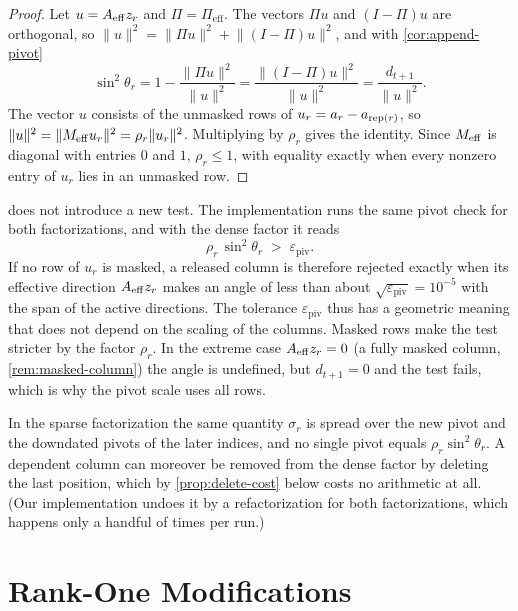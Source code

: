 \begin{proof}
Let $u = A_{\mathrm{eff}} z_r$ and $\Pi = \Pi_{\mathrm{eff}}$. The vectors $\Pi u$ and $(I-\Pi)u$ are orthogonal,
so $\lVert u\rVert^2 = \lVert\Pi u\rVert^2 + \lVert(I-\Pi)u\rVert^2$, and with \cref{cor:append-pivot}
\[
\sin^2\theta_r = 1 - \frac{\lVert\Pi u\rVert^2}{\lVert u\rVert^2}
= \frac{\lVert(I-\Pi)u\rVert^2}{\lVert u\rVert^2} = \frac{d_{t+1}}{\lVert u\rVert^2}.
\]
The vector $u$ consists of the unmasked rows of $u_r = a_r - a_{\operatorname{rep}(r)}$, so
$\lVert u\rVert^2 = \lVert M_{\mathrm{eff}} u_r\rVert^2 = \rho_r\lVert u_r\rVert^2$. Multiplying by $\rho_r$ gives
the identity. Since $M_{\mathrm{eff}}$ is diagonal with entries $0$ and $1$, $\rho_r\le1$, with equality
exactly when every nonzero entry of $u_r$ lies in an unmasked row.
\end{proof}

\begin{remark} \label{rem:dense-detection}
 does not introduce a new test. The implementation runs the same pivot
check for both factorizations, and with the dense factor it reads
\[
\rho_r\,\sin^2\theta_r \;>\; \varepsilon_{\mathrm{piv}} .
\]
If no row of $u_r$ is masked, a released column is therefore rejected exactly when its effective
direction $A_{\mathrm{eff}} z_r$ makes an angle of less than about $\sqrt{\varepsilon_{\mathrm{piv}}} = 10^{-5}$
with the span of the active directions. The tolerance $\varepsilon_{\mathrm{piv}}$ thus has a
geometric meaning that does not depend on the scaling of the columns. Masked rows make the
test stricter by the factor $\rho_r$. In the extreme case $A_{\mathrm{eff}} z_r = 0$ (a fully masked column,
\cref{rem:masked-column}) the angle is undefined, but $d_{t+1} = 0$ and the test fails, which is
why the pivot scale uses all rows.

In the sparse factorization the same quantity $\sigma_r$ is spread over the new pivot and the
downdated pivots of the later indices, and no single pivot equals $\rho_r\sin^2\theta_r$. A
dependent column can moreover be removed from the dense factor by deleting the last position,
which by \cref{prop:delete-cost} below costs no arithmetic at all. (Our implementation undoes it by a
refactorization for both factorizations, which happens only a handful of times per run.)
\end{remark}


\section{Rank-One Modifications}
\label{sec:dense-rank-one}

